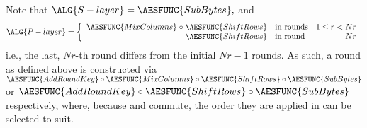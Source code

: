 \noindent
Note that
$
\ALG{S-layer} = \AESFUNC{SubBytes} ,
$
and
\[
\ALG{P-layer} = \left\{\begin{array}{l@{\;}c@{\;}l lr}
                       \AESFUNC{MixColumns} &\circ& \AESFUNC{ShiftRows} & \mbox{in rounds} & 1 \leq r < Nr \\
                                            &     & \AESFUNC{ShiftRows} & \mbox{in round } &            Nr \\
                       \end{array}
                \right.
\]
i.e., the last, $Nr$-th round differs from the initial $Nr - 1$ rounds.  As
such, a round as defined above is constructed via
$
\AESFUNC{AddRoundKey} \circ \AESFUNC{MixColumns} \circ \AESFUNC{ShiftRows} \circ \AESFUNC{SubBytes} 
$
or
$
\AESFUNC{AddRoundKey} \circ                            \AESFUNC{ShiftRows} \circ \AESFUNC{SubBytes}
$
respectively, where, because  and 
commute, the order they are applied in can be selected to suit.

